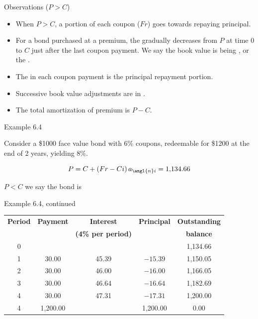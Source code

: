 \documentclass{beamer}
\begin{document}
\begin{frame}{Observations ($P > C$)}

\begin{itemize}
\item When $P > C$, a portion of each coupon ($Fr$) goes towards repaying principal.
\item For a bond purchased at a premium, the  gradually decreases from $P$ at time 0 to $C$ just after the last coupon payment. We say the book value is being , or the .
\item The  in each coupon payment is the principal repayment portion.
\item Successive book value adjustments are in .
\item The total amortization of premium is $P - C$.
\end{itemize}

\end{frame}

\begin{frame}{Example 6.4}

Consider a \$1000 face value bond with 6\% coupons, redeemable for \$1200 at the end of 2 years, yielding 8\%.

\begin{center}
\end{center}

\[
P = C + (Fr - Ci)\,a_{\angl{n}i} = 1{,}134.66
\]

$P < C$ we say the bond is 

\end{frame}

\begin{frame}{Example 6.4, continued}

\begin{center}
\renewcommand{\arraystretch}{1.35}
\small
\begin{tabular}{ccccc}
\toprule
\textbf{Period} & \textbf{Payment} & \textbf{Interest} & \textbf{Principal} & \textbf{Outstanding} \\
 & & \textbf{(4\% per period)} & & \textbf{balance} \\
\midrule
0 & & & & 1,134.66 \\
1 & 30.00 & 45.39 & $-15.39$ & 1,150.05 \\
2 & 30.00 & 46.00 & $-16.00$ & 1,166.05 \\
3 & 30.00 & 46.64 & $-16.64$ & 1,182.69 \\
4 & 30.00 & 47.31 & $-17.31$ & 1,200.00 \\
4 & 1,200.00 & & 1,200.00 & 0.00 \\
\bottomrule
\end{tabular}
\end{center}

\end{frame}
\end{document}
